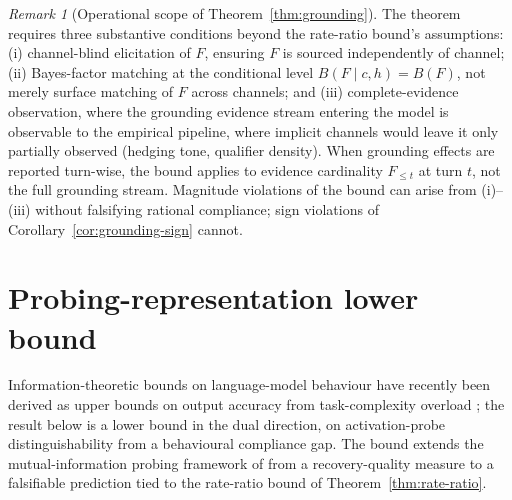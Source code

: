 \documentclass[11pt]{article}
\theoremstyle{definition}
\theoremstyle{remark}
\newtheorem{remark}{Remark}
\begin{document}
\begin{remark}[Operational scope of Theorem~\ref{thm:grounding}]
\label{rem:grounding-scope}
The theorem requires three substantive conditions beyond the rate-ratio bound's
assumptions: (i) channel-blind elicitation of $F$, ensuring $F$ is sourced
independently of channel; (ii) Bayes-factor matching at the conditional level
$B(F \mid c, h) = B(F)$, not merely surface matching of $F$ across channels; and
(iii) complete-evidence observation, where the grounding evidence stream entering
the model is observable to the empirical pipeline, where implicit channels would
leave it only partially observed (hedging tone, qualifier density). When grounding effects
are reported turn-wise, the bound applies to evidence cardinality $F_{\le t}$ at
turn $t$, not the full grounding stream. Magnitude violations of the bound can
arise from (i)--(iii) without falsifying rational compliance; sign violations of
Corollary~\ref{cor:grounding-sign} cannot.
\end{remark}

\section{Probing-representation lower bound}
\label{sec:probing}

Information-theoretic bounds on language-model behaviour have recently been
derived as upper bounds on output accuracy from task-complexity overload
\cite{wan2025fano}; the result below is a lower bound in the dual direction, on
activation-probe distinguishability from a behavioural compliance gap. The bound
extends the mutual-information probing framework of \cite{belinkov2022probing,
pimentel2020infotheory} from a recovery-quality measure to a falsifiable
prediction tied to the rate-ratio bound of Theorem~\ref{thm:rate-ratio}.
\end{document}
